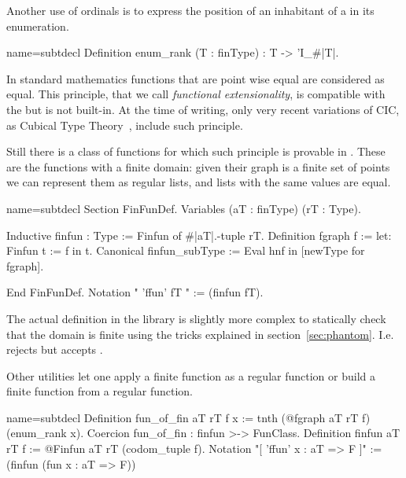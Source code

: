 Another use of ordinals is to express the position of an
inhabitant of a  in its enumeration.

\begin{coq}{name=subtdecl}{}
Definition enum_rank (T : finType) : T -> 'I_#|T|.
\end{coq}

\mcbLEARN{}
\mcbPROVIDE{}
\mcbREQUIRE{}

In standard mathematics functions that are point wise equal are
considered as equal.  This principle, that we call \emph{functional
extensionality}, is compatible with the \mcbCIC{} but is not built-in.
At the time of writing, only very recent variations of CIC,
as Cubical Type Theory~\cite{cubicaltt}, include such principle.

Still there is a class of functions for which such principle is
provable in \Coq{}.  These are the functions with a finite domain:
given their graph is a finite set of points we can represent them
as regular lists, and lists with the same values are equal.

\begin{coq}{name=subtdecl}{}
Section FinFunDef.
Variables (aT : finType) (rT : Type).

Inductive finfun : Type := Finfun of #|aT|.-tuple rT.
Definition fgraph f := let: Finfun t := f in t.
Canonical finfun_subType := Eval hnf in [newType for fgraph].

End FinFunDef.
Notation "{ 'ffun' fT }" := (finfun fT).
\end{coq}

The actual definition in the \mcbMC{} library is slightly more complex
to statically check that the domain is finite using the tricks
explained in section~\ref{sec:phantom}.  I.e. \Coq{} rejects
 but accepts .

Other utilities let one apply a finite function as a regular function
or build a finite function from a regular function.

\begin{coq}{name=subtdecl}{}
Definition fun_of_fin aT rT f x := tnth (@fgraph aT rT f) (enum_rank x).
Coercion fun_of_fin : finfun >-> FunClass.
Definition finfun aT rT f := @Finfun aT rT (codom_tuple f).
Notation "[ 'ffun' x : aT => F ]" := (finfun (fun x : aT => F))
\end{coq}

